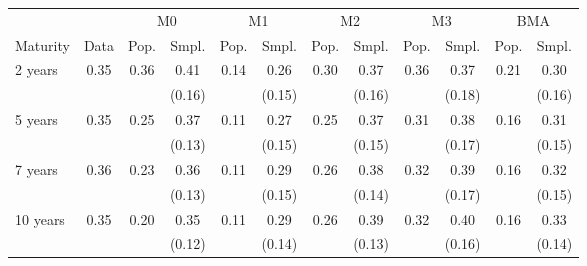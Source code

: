 \begin{tabular}{l|c |cc |cc |cc |cc |cc } \hline \hline 
   &  & \multicolumn{2}{|c}{M0} & \multicolumn{2}{|c}{M1} & \multicolumn{2}{|c}{M2} & \multicolumn{2}{|c}{M3} & \multicolumn{2}{|c}{BMA} \\ 
Maturity & Data  & Pop. & Smpl. & Pop. & Smpl. & Pop. & Smpl. & Pop. & Smpl. & Pop. & Smpl. \\ \hline 
2 years& 0.35  & 0.36  & 0.41  & 0.14  & 0.26  & 0.30  & 0.37  & 0.36  & 0.37  & 0.21  & 0.30  \\ 
&&& (0.16)&& (0.15)&& (0.16)&& (0.18)&& (0.16)\\ 
 \hline 
5 years& 0.35  & 0.25  & 0.37  & 0.11  & 0.27  & 0.25  & 0.37  & 0.31  & 0.38  & 0.16  & 0.31  \\ 
&&& (0.13)&& (0.15)&& (0.15)&& (0.17)&& (0.15)\\ 
 \hline 
7 years& 0.36  & 0.23  & 0.36  & 0.11  & 0.29  & 0.26  & 0.38  & 0.32  & 0.39  & 0.16  & 0.32  \\ 
&&& (0.13)&& (0.15)&& (0.14)&& (0.17)&& (0.15)\\ 
 \hline 
10 years& 0.35  & 0.20  & 0.35  & 0.11  & 0.29  & 0.26  & 0.39  & 0.32  & 0.40  & 0.16  & 0.33  \\ 
&&& (0.12)&& (0.14)&& (0.13)&& (0.16)&& (0.14)\\ 
 \hline 
\hline 
 \end{tabular}
